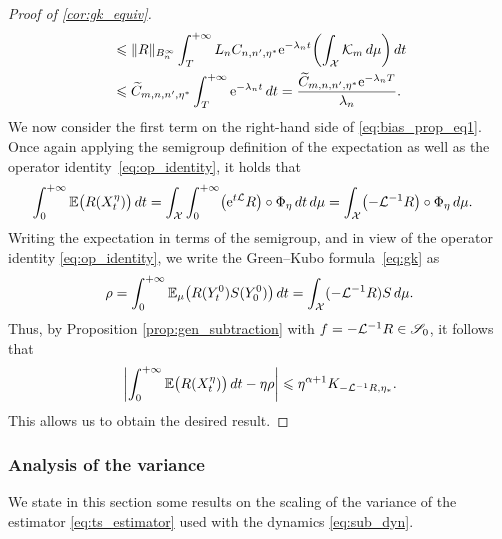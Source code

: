 \begin{proof}[Proof of \cref{cor:gk_equiv}]
\begin{align}
		&\leq \norm{R}_{B^\infty_n}\int_T^{+\infty} L_n C_{n,n',\eta^*} \e^{-\lambda_n t} \paren*{\int_\mathcal{X} \mathcal{K}_m \, d\mu} \, dt \\
		&\leq \widetilde{C}_{m,n,n',\eta^*}\int_T^{+\infty} \e^{-\lambda_n t} \, dt %
		= \frac{\widetilde{C}_{m,n,n',\eta^*}\e^{-\lambda_n T}}{\lambda_n}. %
	\end{align}
	We now consider the first term on the right-hand side of \eqref{eq:bias_prop_eq1}. 
	Once again applying the semigroup definition of the expectation as well as the operator identity~\eqref{eq:op_identity}, it holds that
	\begin{align}
		\int_0^{+\infty} \E\bigl(R(X^\eta_t)\bigr) \, dt %
		&= \int_\mathcal{X}\int_0^{+\infty} \bigl(\e^{t\L}R\bigr)\circ \Phi_\eta \, dt \, d\mu
		= \int_\mathcal{X} \bigl(-\L^{-1}R\bigr)\circ \Phi_\eta \, d\mu.
	\end{align}
	Writing the expectation in terms of the semigroup, and in view of the operator identity \eqref{eq:op_identity}, we write the Green--Kubo formula~\eqref{eq:gk} as
	\begin{align}
		\rho = \int_0^{+\infty} \E_\mu\bigl(R(Y_t^0)S(Y_0^0)\bigr) \, dt = \int_\mathcal{X} (-\L^{-1}R)S \, d\mu.
	\end{align}
	Thus, by Proposition \ref{prop:gen_subtraction} with $f = -\L^{-1}R \in \S_0$, it follows that
	\begin{equation}
		\abs*{\int_0^{+\infty} \E\bigl(R(X^\eta_t)\bigr) \, dt - \eta\rho} \leq \eta^{\alpha+1} K_{-\L^{-1}R,\eta_*}.
	\end{equation}
	This allows us to obtain the desired result.
\end{proof}

\subsubsection{Analysis of the variance}
\label{subsubsec:variance_analysis}
We state in this section some results on the scaling of the variance of the estimator \eqref{eq:ts_estimator} used with the dynamics \eqref{eq:sub_dyn}.

